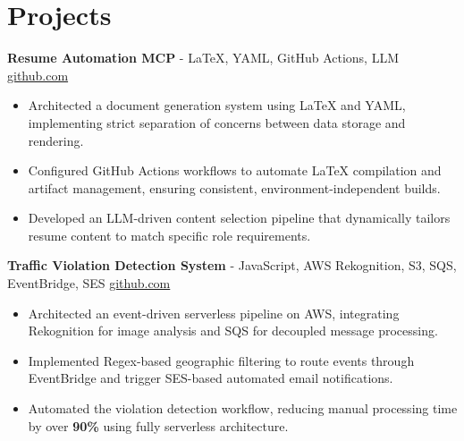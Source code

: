 \documentclass[11pt]{article}
\begin{document}

\vspace{-18.5pt}

\section*{Projects}

\textbf{Resume Automation MCP}{ - LaTeX, YAML, GitHub Actions, LLM} \hfill \href{https://github.com/Monica20030707/Tex_OrangeLeaf-mcp}{github.com}
\vspace{-9pt}
\begin{itemize}
  \item Architected a document generation system using LaTeX and YAML, implementing strict separation of concerns between data storage and rendering.
  \item Configured GitHub Actions workflows to automate LaTeX compilation and artifact management, ensuring consistent, environment-independent builds.
  \item Developed an LLM-driven content selection pipeline that dynamically tailors resume content to match specific role requirements.
\end{itemize}

\textbf{Traffic Violation Detection System}{ - JavaScript, AWS Rekognition, S3, SQS, EventBridge, SES} \hfill \href{https://github.com/Monica20030707/AWS_rekonigition-N-read-database}{github.com}
\vspace{-9pt}
\begin{itemize}
  \item Architected an event-driven serverless pipeline on AWS, integrating Rekognition for image analysis and SQS for decoupled message processing.
  \item Implemented Regex-based geographic filtering to route events through EventBridge and trigger SES-based automated email notifications.
  \item Automated the violation detection workflow, reducing manual processing time by over \textbf{90\%} using fully serverless architecture.
\end{itemize}
\end{document}
